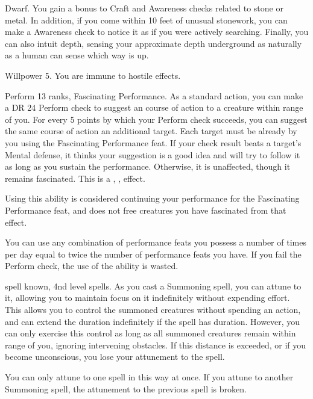 \featpre Dwarf.
\featben You gain a  bonus to Craft and Awareness checks related to stone or metal.
In addition, if you come within 10 feet of unusual stonework, you can make a Awareness check to notice it as if you were actively searching.
Finally, you can also intuit depth, sensing your approximate depth underground as naturally as a human can sense which way is up.

\featpre Willpower 5.
\featben You are immune to hostile  effects.

\featpres Perform 13 ranks, Fascinating Performance.
\featben As a standard action, you can make a DR 24 Perform check to suggest an course of action to a creature within \rngmed range of you.
For every 5 points by which your Perform check succeeds, you can suggest the same course of action an additional target.
Each target must be already \fascinated by you using the Fascinating Performance feat.
If your check result beats a target's Mental defense, it thinks your suggestion is a good idea and will try to follow it as long as you sustain the performance.
Otherwise, it is unaffected, though it remains fascinated.
This is a , ,  effect.

Using this ability is considered continuing your performance for the Fascinating Performance feat, and does not free creatures you have fascinated from that effect.

 You can use any combination of performance feats you possess a number of times per day equal to twice the number of performance feats you have.
If you fail the Perform check, the use of the ability is wasted.

\featpres {} spell known, 4nd level spells.
\featben As you cast a Summoning spell, you can attune to it, allowing you to maintain focus on it indefinitely without expending effort.
This allows you to control the summoned creatures without spending an action, and can extend the duration indefinitely if the spell has \durshort duration.
However, you can only exercise this control as long as all summoned creatures remain within \rnglong range of you, ignoring intervening obstacles.
If this distance is exceeded, or if you become unconscious, you lose your attunement to the spell.

You can only attune to one spell in this way at once.
If you attune to another Summoning spell, the attunement to the previous spell is broken.


